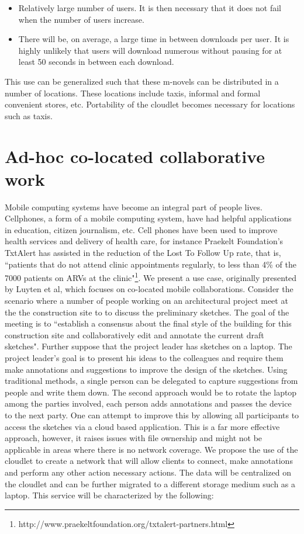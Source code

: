 \begin{itemize}
\item Relatively large number of users. It is then necessary that it does not fail when the number of users increase.

\item There will be, on average, a large time in between downloads per user. It is highly unlikely that users will download numerous without pausing for at least 50 seconds in between each download.
\end{itemize}

This use can be generalized such that these m-novels can be distributed in a number of locations. These locations include taxis, informal and formal convenient stores, etc. Portability of the cloudlet becomes necessary for locations such as taxis.


\section{Ad-hoc co-located collaborative work}
Mobile computing systems have become an integral part of people lives. Cellphones, a form of a mobile computing system, have had helpful applications in education, citizen journalism, etc. Cell phones have been used to improve health services and delivery of health care, for instance Praekelt Foundation's TxtAlert has assisted in the reduction of the Lost To Follow Up rate, that is, ``patients that do not attend clinic appointments regularly, to less than 4\% of the 7000 patients on ARVs at the clinic"\footnote{http://www.praekeltfoundation.org/txtalert-partners.html}. We present a use case, originally presented by Luyten et al\cite{luyten2007ad}, which focuses on co-located mobile collaborations. Consider the scenario where a number of people working on an architectural project meet at the the construction
site to to discuss the preliminary sketches. The goal of the
meeting is to ``establish a consensus about the final style of
the building for this construction site and collaboratively
edit and annotate the current draft sketches"\cite[p. 507]{luyten2007ad}.
Further suppose that the project leader has sketches on a laptop.
The project leader's goal is to present his ideas to the colleagues
and require them make annotations and suggestions to improve the design of the sketches. Using traditional methods, a single person can be delegated to capture
suggestions from people and write them down. The second approach would be to
rotate the laptop among the parties involved, each
person adds annotations and passes the device to the next party. One can
attempt to improve this by allowing all participants to access the sketches via
a cloud based application. This is a far more effective approach, however,
it raises issues with file ownership and might not be applicable in areas where
there is no network coverage. We propose the use of the cloudlet to create a network that will allow clients to connect, make annotations and perform any other action necessary actions. The data will be centralized on the cloudlet and can be further migrated to a different storage medium such as a laptop. This service will be characterized by the following:

